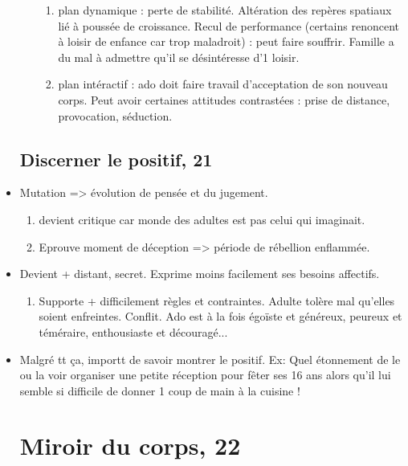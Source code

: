 \documentclass[12pt]{report}
\begin{document}
\begin{itemize}
\begin{enumerate}
\begin{enumerate}
\item plan dynamique : perte de stabilité. Altération des repères spatiaux lié à poussée de croissance. Recul de performance (certains renoncent à loisir de enfance car trop maladroit) : peut faire souffrir. Famille a du mal à admettre qu'il se désintéresse d'1 loisir.\\

\item plan intéractif : ado doit faire travail d'acceptation de son nouveau corps. Peut avoir certaines attitudes contrastées : prise de distance, provocation, séduction.\\
\end{enumerate}
\end{enumerate}

\subsection{Discerner le positif, 21}

\item Mutation => évolution de pensée et du jugement.
\begin{enumerate}
\item devient critique car monde des adultes est pas celui qui imaginait.\\
\item Eprouve moment de déception => période de rébellion enflammée.
\end{enumerate}

\item Devient + distant, secret. Exprime moins facilement ses besoins affectifs.
\begin{enumerate}
\item Supporte + difficilement règles et contraintes. Adulte tolère mal qu'elles soient enfreintes. Conflit. Ado est à la fois égoïste et généreux, peureux et téméraire, enthousiaste et découragé...\\
\end{enumerate}

\item Malgré tt ça, importt de savoir montrer le positif. Ex: Quel étonnement de le ou la voir organiser une petite réception pour fêter ses 16 ans alors qu'il lui semble si difficile de donner 1 coup de main à la cuisine !

\section{Miroir du corps, 22}


\end{itemize}
\end{document}

